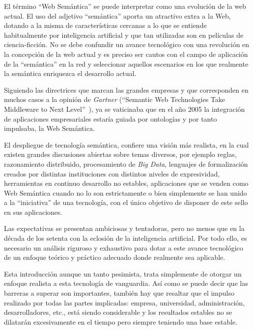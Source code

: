 El término ``Web Semántica'' se puede interpretar como una evolución de la web
actual. El uso del adjetivo ``semántica'' aporta un atractivo extra a la Web, dotando a la misma de características cercanas a lo que se entiende 
habitualmente por inteligencia artificial y que tan utilizadas son en películas de ciencia-ficción.
No se debe confundir un avance tecnológico con una revolución en la concepción
de la web actual y es preciso ser cautos con el campo de aplicación de la
``semántica'' en la red y seleccionar aquellos escenarios en los que realmente
la semántica enriquezca el desarrollo actual.

Siguiendo las directrices que marcan las grandes empresas y que
corresponden en muchos casos a la opinión de \textit{Gartner} (``Semantic Web Technologies
Take Middleware to Next Level''~\cite{gartner}), ya se vaticinaba que en el año 2005 la integración de 
aplicaciones empresariales estaría guiada por ontologías y por tanto impulsaba, la Web Semántica.

El despliegue de tecnología semántica, confiere una visión más realista, en
la cual existen grandes discusiones abiertas sobre temas diversos, por ejemplo
reglas, razonamiento distribuido, procesamiento de \textit{\gls{Big Data}}, lenguajes de formalización creados por distintas instituciones 
con distintos niveles de expresividad, herramientas en continuo desarrollo no
estables, aplicaciones que se venden como Web Semántica cuando no lo son
estrictamente o bien simplemente se han unido a la ``iniciativa'' de una tecnología, con el único objetivo de disponer 
de este sello en sus aplicaciones. 

Las expectativas se presentan ambiciosas y tentadoras, pero no menos que en la década de los setenta con la eclosión 
de la inteligencia artificial. Por todo ello, es necesario un análisis riguroso y exhaustivo para dotar a este avance
tecnológico de un enfoque teórico y práctico adecuado donde realmente sea aplicable.  

Esta introducción aunque un tanto pesimista, trata simplemente de otorgar un enfoque
realista a esta tecnología de vanguardia. Así como se puede decir que las barreras a
superar son importantes, también hay que resaltar que el impulso realizado por
todas las partes implicadas: empresa, universidad, administración, desarrolladores,
etc., está siendo considerable y los resultados estables no se dilatarán excesivamente en el tiempo pero
siempre teniendo una base estable. 